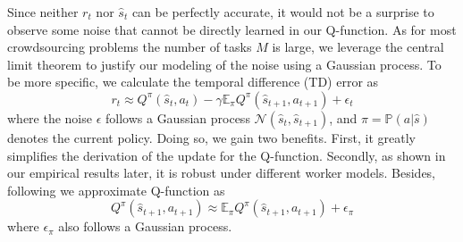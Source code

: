 Since neither $r_t$ nor $\hat{s}_t$ can be perfectly accurate, it would not be a surprise to observe some noise that cannot be directly learned in our Q-function. %
As for most crowdsourcing problems the number of tasks $M$ is large, we leverage the central limit theorem to justify our modeling of the noise using a Gaussian process.
To be more specific, we calculate the temporal difference (TD) error as 
\begin{equation}
r_t \approx Q^\pi(\hat{s}_t, a_t) - \gamma \mathbb{E}_{\pi}Q^{\pi}(\hat{s}_{t+1},a_{t+1}) + \epsilon_t 
\end{equation}
where the noise $\epsilon $ follows a Gaussian process $\mathcal{N}(\hat{s}_t,\hat{s}_{t+1})$, and $\pi=\mathbb{P}(a|\hat{s})$ denotes the current policy.
 Doing so, we gain two benefits. First, it greatly simplifies the derivation of the update for the Q-function. Secondly, as shown in our empirical results later, it is robust under different worker models.
Besides, following \citet{gasic2014gaussian} we approximate Q-function as
$$
Q^{\pi}(\hat{s}_{t+1},a_{t+1})\approx\mathbb{E}_{\pi}Q^{\pi}(\hat{s}_{t+1},a_{t+1})+\epsilon_{\pi}
$$
where $\epsilon_{\pi}$ also follows a Gaussian process.

